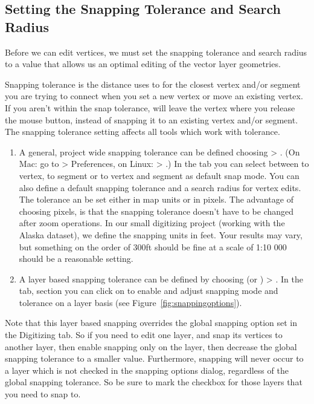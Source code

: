 \subsection{Setting the Snapping Tolerance and Search Radius}\label{snapping_tolerance}

Before we can edit vertices, we must set the snapping
tolerance and search radius to a value that allows us an optimal editing of
the vector layer geometries.


Snapping tolerance is the distance \qg uses to  for the
closest vertex and/or segment you are trying to
connect when you set a new vertex or move an existing vertex. If you aren't
within the snap tolerance, \qg will leave the vertex where you release the
mouse button, instead of snapping it to an existing vertex and/or segment.
The snapping tolerance setting affects all tools which work with tolerance.

\begin{enumerate}
\item A general, project wide snapping tolerance can be defined choosing
 > .
(On Mac: go to  \mainmenuopt{\qg} > Preferences, on Linux:  > .)
In the  tab you can select between to vertex, to segment or
to vertex and segment as default snap mode. You can also define a default
snapping tolerance and a search radius for vertex edits. The tolerance an be
set either in map units or in pixels. The advantage of choosing pixels, is
that the snapping tolerance doesn't have to be changed after zoom operations.
In our small digitizing project (working with the Alaska dataset), we define
the snapping units in feet. Your results may vary, but something on the order
of 300ft should be fine at a scale of 1:10 000 should be a reasonable
setting.
\item A layer based snapping tolerance can be defined by choosing
 (or ) > . In the  tab, section  you
can click on  to enable and adjust snapping
mode and tolerance on a layer basis (see Figure~\ref{fig:snappingoptions}).
\end{enumerate}
Note that this layer based snapping overrides the global snapping option set in the Digitizing tab. So if you need to edit one layer, and snap its vertices to another layer, then enable snapping only on the  layer, then decrease the global snapping tolerance to a smaller value.  Furthermore, snapping will never occur to a layer which is not checked in the snapping options dialog, regardless of the global snapping tolerance. So be sure to mark the checkbox for those layers that you need to snap to.

